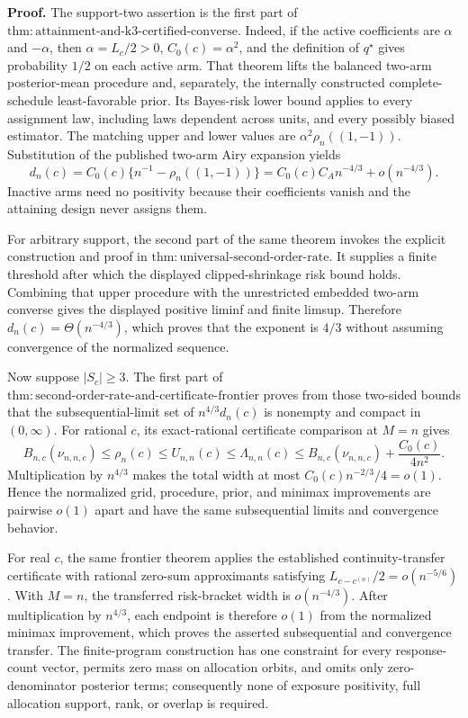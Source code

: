 \textbf{Proof.}
The support-two assertion is the first part of \(\mathrm{thm:attainment\text{-}and\text{-}k3\text{-}certified\text{-}converse}\). Indeed, if the active coefficients are \(\alpha\) and \(-\alpha\), then \(\alpha=L_c/2>0\), \(C_0(c)=\alpha^2\), and the definition of \(q^\star\) gives probability \(1/2\) on each active arm. That theorem lifts the balanced two-arm posterior-mean procedure and, separately, the internally constructed complete-schedule least-favorable prior. Its Bayes-risk lower bound applies to every assignment law, including laws dependent across units, and every possibly biased estimator. The matching upper and lower values are \(\alpha^2\rho_n((1,-1))\). Substitution of the published two-arm Airy expansion yields
\[
 d_n(c)
 =C_0(c)\{n^{-1}-\rho_n((1,-1))\}
 =C_0(c)C_A n^{-4/3}+o(n^{-4/3}).
\]
Inactive arms need no positivity because their coefficients vanish and the attaining design never assigns them.

For arbitrary support, the second part of the same theorem invokes the explicit construction and proof in \(\mathrm{thm:universal\text{-}second\text{-}order\text{-}rate}\). It supplies a finite threshold after which the displayed clipped-shrinkage risk bound holds. Combining that upper procedure with the unrestricted embedded two-arm converse gives the displayed positive liminf and finite limsup. Therefore \(d_n(c)=\Theta(n^{-4/3})\), which proves that the exponent is \(4/3\) without assuming convergence of the normalized sequence.

Now suppose \(|S_c|\geq3\). The first part of \(\mathrm{thm:second\text{-}order\text{-}rate\text{-}and\text{-}certificate\text{-}frontier}\) proves from those two-sided bounds that the subsequential-limit set of \(n^{4/3}d_n(c)\) is nonempty and compact in \((0,\infty)\). For rational \(c\), its exact-rational certificate comparison at \(M=n\) gives
\[
 B_{n,c}(\nu_{n,n,c})\leq\rho_n(c)\leq U_{n,n}(c)
 \leq\Lambda_{n,n}(c)
 \leq B_{n,c}(\nu_{n,n,c})+\frac{C_0(c)}{4n^2}.
\]
Multiplication by \(n^{4/3}\) makes the total width at most \(C_0(c)n^{-2/3}/4=o(1)\). Hence the normalized grid, procedure, prior, and minimax improvements are pairwise \(o(1)\) apart and have the same subsequential limits and convergence behavior.

For real \(c\), the same frontier theorem applies the established continuity-transfer certificate with rational zero-sum approximants satisfying \(L_{c-c^{(n)}}/2=o(n^{-5/6})\). With \(M=n\), the transferred risk-bracket width is \(o(n^{-4/3})\). After multiplication by \(n^{4/3}\), each endpoint is therefore \(o(1)\) from the normalized minimax improvement, which proves the asserted subsequential and convergence transfer. The finite-program construction has one constraint for every response-count vector, permits zero mass on allocation orbits, and omits only zero-denominator posterior terms; consequently none of exposure positivity, full allocation support, rank, or overlap is required.

